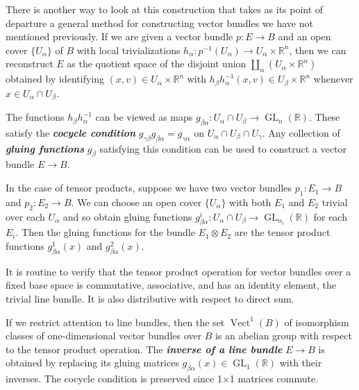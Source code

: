 \documentclass{article}
\newcommand{\R}{\mathbb{R}}
\DeclareMathOperator{\Vect}{Vect}
\DeclareMathOperator{\GL}{GL}
\begin{document}
\begin{remark}
	There is another way to look at this construction that takes as its point of departure a general method for constructing vector bundles we have not mentioned previously. If we are given a vector bundle $p:E\to B$ and an open cover $\{U_\alpha\}$ of $B$ with local trivializations $h_\alpha:p^{-1}(U_\alpha)\to U_\alpha\times\R^n$, then we can reconstruct $E$ as the quotient space of the disjoint union $\coprod_\alpha(U_\alpha\times\R^n)$ obtained by identifying $(x,v)\in U_\alpha\times\R^n$ with $h_\beta h_\alpha^{-1}(x,v)\in U_\beta\times\R^n$ whenever $x\in U_\alpha\cap U_\beta$.
	
	The functions $h_\beta h_\alpha^{-1}$ can be viewed as maps $g_{\beta\alpha}:U_\alpha\cap U_\beta\to \GL_n(\R)$. These satisfy the \textbf{\textit{cocycle condition}}\label{cocycle-condition} $g_{\gamma\beta}g_{\beta\alpha}=g_{\gamma\alpha}$ on $U_\alpha\cap U_\beta\cap U_\gamma$. Any collection of \textbf{\textit{gluing functions}} $g_{\beta}$ satisfying this condition can be used to construct a vector bundle $E\to B$.
	
	In the case of tensor products, suppose we have two vector bundles $p_1:E_1\to B$ and $p_2:E_2\to B$. We can choose an open cover $\{U_\alpha\}$ with both $E_1$ and $E_2$ trivial over each $U_\alpha$ and so obtain gluing functions $g_{\beta\alpha}^i:U_\alpha\cap U_\beta\to\GL_{n_i}(\R)$ for each $E_i$. Then the gluing functions for the bundle $E_1\otimes E_2$ are the tensor product functions $g_{\beta\alpha}^1(x)$ and $g_{\beta\alpha}^2(x)$.
\end{remark}
\begin{prop}
	It is routine to verify that the tensor product operation for vector bundles over a fixed base space is commutative, associative, and has an identity element, the trivial line bundle. It is also distributive with respect to direct sum.
\end{prop}
\begin{defn}
	If we restrict attention to line bundles, then the set $\Vect^1(B)$ of isomorphism classes of one-dimensional vector bundles over $B$ is an abelian group with respect to the tensor product operation. The \textbf{\textit{inverse of a line bundle}} $E\to B$ is obtained by replacing its gluing matrices $g_{\beta\alpha}(x)\in\GL_1(\R)$ with their inverses. The cocycle condition is preserved since 1×1 matrices commute.
\end{defn}
\end{document}
